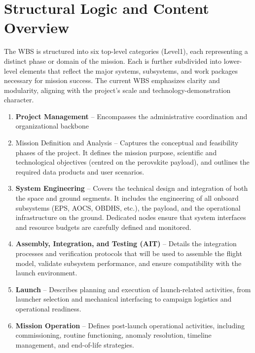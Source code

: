 \section{Structural Logic and Content Overview} 
The WBS is structured into six top-level categories (Level1), each representing a distinct phase or domain of the mission. Each is further subdivided into lower-level elements that reflect the major systems, subsystems, and work packages necessary for
mission success. The current WBS emphasizes clarity and modularity, aligning with the project's scale and technology-demonstration character.
\begin{enumerate}
    \item \textbf{Project Management} – Encompasses the administrative coordination and organizational backbone
    \item Mission Definition and Analysis – Captures the conceptual and feasibility phases of the project. It defines the mission purpose, scientific and technological objectives (centred on the perovskite payload), and outlines the required data products and user scenarios.
    \item \textbf{System Engineering} – Covers the technical design and integration of both the space and ground segments. It includes the engineering of all onboard subsystems (EPS, AOCS, OBDHS, etc.), the payload, and the operational infrastructure on the ground. Dedicated nodes ensure that system interfaces and resource budgets are carefully defined and monitored.
    \item \textbf{Assembly, Integration, and Testing (AIT)} – Details the integration processes and verification protocols that will be used to assemble the flight model, validate subsystem performance, and ensure compatibility with the launch environment.
    \item \textbf{Launch} – Describes planning and execution of launch-related activities, from launcher selection and mechanical interfacing to campaign logistics and operational readiness.
    \item \textbf{Mission Operation} – Defines post-launch operational activities, including commissioning, routine functioning, anomaly resolution, timeline management, and end-of-life strategies.
\end{enumerate}

